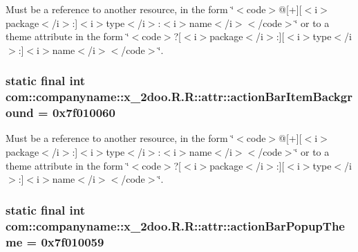 Must be a reference to another resource, in the form \char`\"{}$<$code$>$@\mbox{[}+\mbox{]}\mbox{[}$<$i$>$package$<$/i$>$:\mbox{]}$<$i$>$type$<$/i$>$:$<$i$>$name$<$/i$>$$<$/code$>$\char`\"{} or to a theme attribute in the form \char`\"{}$<$code$>$?\mbox{[}$<$i$>$package$<$/i$>$:\mbox{]}\mbox{[}$<$i$>$type$<$/i$>$:\mbox{]}$<$i$>$name$<$/i$>$$<$/code$>$\char`\"{}. \hypertarget{classcom_1_1companyname_1_1x__2doo_1_1_r_1_1attr_937f51d1561dde65a4bfec207141964b}{
\subsubsection[{actionBarItemBackground}]{\setlength{\rightskip}{0pt plus 5cm}static final int com::companyname::x\_\-2doo.R.R::attr::actionBarItemBackground = 0x7f010060}}
\label{classcom_1_1companyname_1_1x__2doo_1_1_r_1_1attr_937f51d1561dde65a4bfec207141964b}


Must be a reference to another resource, in the form \char`\"{}$<$code$>$@\mbox{[}+\mbox{]}\mbox{[}$<$i$>$package$<$/i$>$:\mbox{]}$<$i$>$type$<$/i$>$:$<$i$>$name$<$/i$>$$<$/code$>$\char`\"{} or to a theme attribute in the form \char`\"{}$<$code$>$?\mbox{[}$<$i$>$package$<$/i$>$:\mbox{]}\mbox{[}$<$i$>$type$<$/i$>$:\mbox{]}$<$i$>$name$<$/i$>$$<$/code$>$\char`\"{}. \hypertarget{classcom_1_1companyname_1_1x__2doo_1_1_r_1_1attr_d8d08b71d46e591ceb2cf37aff400388}{
\subsubsection[{actionBarPopupTheme}]{\setlength{\rightskip}{0pt plus 5cm}static final int com::companyname::x\_\-2doo.R.R::attr::actionBarPopupTheme = 0x7f010059}}
\label{classcom_1_1companyname_1_1x__2doo_1_1_r_1_1attr_d8d08b71d46e591ceb2cf37aff400388}


